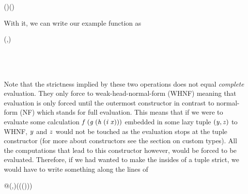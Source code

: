 \documentclass[paper=A4,twoside=true,openright,parskip=full,chapterprefix=true,headings=normal,bibliography=totoc,listof=totoc,titlepage=on,captions=tableabove,draft=false,british]{scrreprt}%
\begin{document}
\begin{hscode}\SaveRestoreHook
{}%
%
\>[B]{}(\mathbin{\$!})\mathbin{::}(\to {})\to {}\to {}\<[E]%
\\
\>[B]{}\mathbin{\$!}\mathrel{=}\;\<[E]%
\ColumnHook
\end{hscode}\resethooks
\vspace{-2\baselineskip}

With it, we can write our example function as


\begin{hscode}\SaveRestoreHook
{}%
%
%
%
\>[B]{}\mathbin{::}\to (,){}\<[E]%
\\
\>[B]{}\;\mathrel{=}\mathbin{\$!}\;\<[E]%
\\
\>[B]{}\<[5]%
\>[5]{}\<[E]%
\\
\>[5]{}\<[9]%
\>[9]{}\mathrel{=}\<[E]%
\\
\>[5]{}\<[9]%
\>[9]{}\mathrel{=}\<[E]%
\ColumnHook
\end{hscode}\resethooks
\vspace{-2\baselineskip}

Note that the strictness implied by these two operations does not equal
\emph{complete} evaluation. They only force to weak-head-normal-form
(WHNF) meaning that evaluation is only forced until the outermost
constructor in contrast to normal-form (NF) which stands for full
evaluation. This means that if we were to evaluate some calculation
\ensuremath{\Varid{f}\;(\Varid{g}\;(\Varid{h}\;(\Varid{i}\;\Varid{x})))} embedded in some lazy tuple \ensuremath{(\Varid{y},\Varid{z})} to WHNF, \ensuremath{\Varid{y}} and
\ensuremath{\Varid{z}} would not be touched as the evaluation stops at the tuple
constructor (for more about constructors see the section on custom
types). All the computations that lead to this constructor however,
would be forced to be evaluated. Therefore, if we had wanted to make the
insides of a tuple strict, we would have to write something along the
lines of


\begin{hscode}\SaveRestoreHook
{}%
%
\>[B]{}\;\;@\;(,)\mathrel{=}\;(\;(\;(\;)))\;\;\<[E]%
\ColumnHook
\end{hscode}\resethooks
\vspace{-2\baselineskip}
\end{document}

